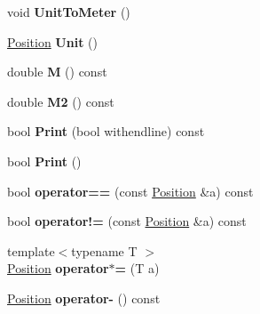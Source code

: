 \begin{DoxyCompactItemize}
\item 
\hypertarget{classPosition_af02152e9534534c2b21414ee26435da9}{void {\bfseries Unit\-To\-Meter} ()}\label{classPosition_af02152e9534534c2b21414ee26435da9}

\item 
\hypertarget{classPosition_aa795d01e1825aec571603081412aedab}{\hyperlink{classPosition}{Position} {\bfseries Unit} ()}\label{classPosition_aa795d01e1825aec571603081412aedab}

\item 
\hypertarget{classPosition_acc7380659f848eac5268337a893fd264}{double {\bfseries M} () const }\label{classPosition_acc7380659f848eac5268337a893fd264}

\item 
\hypertarget{classPosition_abc9a94774679003228dbb648f481a004}{double {\bfseries M2} () const }\label{classPosition_abc9a94774679003228dbb648f481a004}

\item 
\hypertarget{classPosition_a9e1f77cfa7961674ce9b3fed6488786d}{bool {\bfseries Print} (bool withendline) const }\label{classPosition_a9e1f77cfa7961674ce9b3fed6488786d}

\item 
\hypertarget{classPosition_a65491aa32b851bf35260a5d82a9735da}{bool {\bfseries Print} ()}\label{classPosition_a65491aa32b851bf35260a5d82a9735da}

\item 
\hypertarget{classPosition_aa89951f4ed590fe130ddad8e8809c49f}{bool {\bfseries operator==} (const \hyperlink{classPosition}{Position} \&a) const }\label{classPosition_aa89951f4ed590fe130ddad8e8809c49f}

\item 
\hypertarget{classPosition_a2c041236d9451b265b13d275fabde180}{bool {\bfseries operator!=} (const \hyperlink{classPosition}{Position} \&a) const }\label{classPosition_a2c041236d9451b265b13d275fabde180}

\item 
\hypertarget{classPosition_a0cf399ae7029706e94199ad882383e02}{{\footnotesize template$<$typename T $>$ }\\\hyperlink{classPosition}{Position} {\bfseries operator$\ast$=} (T a)}\label{classPosition_a0cf399ae7029706e94199ad882383e02}

\item 
\hypertarget{classPosition_a195ed1edccd36180b1b7c36025630d71}{\hyperlink{classPosition}{Position} {\bfseries operator-\/} () const }\label{classPosition_a195ed1edccd36180b1b7c36025630d71}


\end{DoxyCompactItemize}
